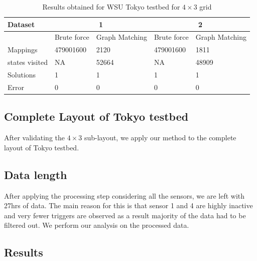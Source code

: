 \begin{table}[!ht]
\centering
\caption{Results obtained for WSU Tokyo testbed for $4 \times 3$ grid}
\label{tab:wsu43res}
\begin{tabularx}{\textwidth}{|X|X|X|X|X|}
\hline
Dataset                                                             & \multicolumn{2}{c|}{1}       & \multicolumn{2}{c|}{2}       \\ \hline
                                                                    & Brute force & Graph Matching & Brute force & Graph Matching \\ \hline
Mappings                                                            & 479001600   & 2120           & 479001600   & 1811           \\ \hline
states visited & NA          & 52664          & NA          & 48909          \\ \hline
Solutions                                                           & 1           & 1              & 1           & 1              \\ \hline
Error                                                               & 0           & 0              & 0           & 0              \\ \hline
\end{tabularx}
\end{table}

\subsection{Complete Layout of Tokyo testbed}

After validating the $4 \times 3$ sub-layout, we apply our method to the complete layout of Tokyo testbed.

\subsection{Data length}
After applying the processing step considering all the sensors, we are left with 27hrs of data. The main reason for this is that sensor 1 and 4 are highly inactive and very fewer triggers are observed as a result majority of the data had to be filtered out. We perform our analysis on the processed data.


\subsection{Results}

